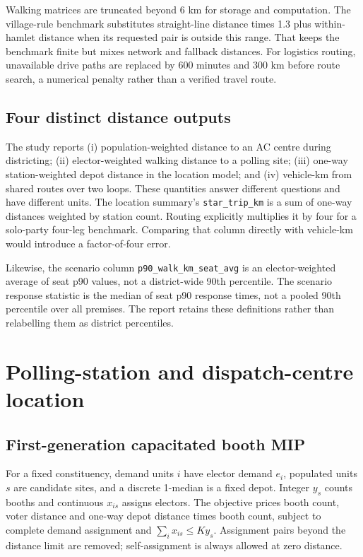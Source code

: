 \documentclass[11pt,a4paper,oneside]{report}
\newcommand{\source}[1]{\par\nopagebreak[4]{\footnotesize\color{teal}Evidence: #1.}\par}
\begin{document}
Walking matrices are truncated beyond 6 km for storage and computation. The village-rule benchmark substitutes straight-line distance times 1.3 plus within-hamlet distance when its requested pair is outside this range. That keeps the benchmark finite but mixes network and fallback distances. For logistics routing, unavailable drive paths are replaced by 600 minutes and 300 km before route search, a numerical penalty rather than a verified travel route.
\source{[S7], [S8], [S10]}

\section{Four distinct distance outputs}
The study reports (i) population-weighted distance to an AC centre during districting; (ii) elector-weighted walking distance to a polling site; (iii) one-way station-weighted depot distance in the location model; and (iv) vehicle-km from shared routes over two loops. These quantities answer different questions and have different units. The location summary's \texttt{star\_trip\_km} is a sum of one-way distances weighted by station count. Routing explicitly multiplies it by four for a solo-party four-leg benchmark. Comparing that column directly with vehicle-km would introduce a factor-of-four error.

Likewise, the scenario column \texttt{p90\_walk\_km\_seat\_avg} is an elector-weighted average of seat p90 values, not a district-wide 90th percentile. The scenario response statistic is the median of seat p90 response times, not a pooled 90th percentile over all premises. The report retains these definitions rather than relabelling them as district percentiles.
\source{[S8]--[S10]}

\chapter{Polling-station and dispatch-centre location}
\section{First-generation capacitated booth MIP}
For a fixed constituency, demand units $i$ have elector demand $e_i$, populated units $s$ are candidate sites, and a discrete 1-median is a fixed depot. Integer $y_s$ counts booths and continuous $x_{is}$ assigns electors. The objective prices booth count, voter distance and one-way depot distance times booth count, subject to complete demand assignment and $\sum_i x_{is}\leq K y_s$. Assignment pairs beyond the distance limit are removed; self-assignment is always allowed at zero distance.
\end{document}
